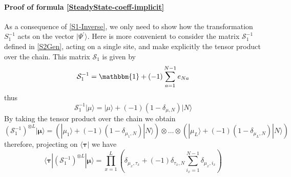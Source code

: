 \documentclass[10pt]{article}
\numberwithin{equation}{section}
\numberwithin{equation}{subsection}
\begin{document}
	\paragraph{Proof of formula \eqref{SteadyState-coeff-implicit}} As a consequence of \eqref{S1-Inverse}, we only need to show how the transformation $S_{1}^{-1}$ acts on the vector $|\Psi^{'}\rangle$. Here is more convenient to consider the matrix $\mathcal{S}_{1}^{-1}$ defined in \eqref{S2Gen}, acting on a single site, and make explicitly the tensor product over the chain. This matrix $\mathcal{S}_{1}$ is given by
	\begin{equation}\label{S1-L1}
		\mathcal{S}_{1}^{-1}=\mathbbm{1}+(-1)\sum_{a=1}^{N-1}e_{Na}
	\end{equation}
thus
\begin{equation}
\mathcal{S}_{1}^{-1}|\mu\rangle=|\mu\rangle+(-1)(1-\delta_{\mu,N})|N\rangle
\end{equation}
By taking the tensor product over the chain we obtain 
\begin{equation}
	\left(\mathcal{S}_{1}^{-1}\right)^{\otimes L}|\bm{\mu}\rangle=\left(|\mu_{1}\rangle+(-1)(1-\delta_{\mu_{1},N})|N\rangle\right)\otimes \ldots \otimes \left(|\mu_{L}\rangle+(-1)(1-\delta_{\mu_{L},N})|N\rangle\right)
\end{equation}
therefore, projecting on $\langle \bm{\tau}|$ we have
\begin{equation}\label{Tensor-S1}
	\langle \bm{\tau}|	\left(\mathcal{S}_{1}^{-1}\right)^{\otimes L}|\bm{\mu}\rangle=\prod_{x=1}^{L}\left(\delta_{\mu_{x},\tau_{x}}+(-1)\delta_{\tau_{x},N}\sum_{i_{x}=1}^{N-1}\delta_{\mu_{x},i_{x}}\right)
\end{equation}
\end{document}
